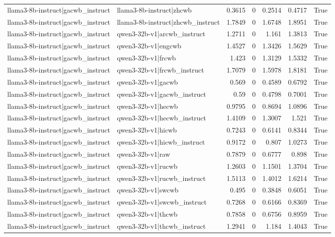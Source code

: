 \begin{table}
\begin{tabular}{l l r r r r l}
llama3-8b-instruct|gacwb_instruct & llama3-8b-instruct|zhcwb & 0.3615 & 0 & 0.2514 & 0.4717 & True \\
llama3-8b-instruct|gacwb_instruct & llama3-8b-instruct|zhcwb_instruct & 1.7849 & 0 & 1.6748 & 1.8951 & True \\
llama3-8b-instruct|gacwb_instruct & qwen3-32b-v1|arcwb_instruct & 1.2711 & 0 & 1.161 & 1.3813 & True \\
llama3-8b-instruct|gacwb_instruct & qwen3-32b-v1|engcwb & 1.4527 & 0 & 1.3426 & 1.5629 & True \\
llama3-8b-instruct|gacwb_instruct & qwen3-32b-v1|frcwb & 1.423 & 0 & 1.3129 & 1.5332 & True \\
llama3-8b-instruct|gacwb_instruct & qwen3-32b-v1|frcwb_instruct & 1.7079 & 0 & 1.5978 & 1.8181 & True \\
llama3-8b-instruct|gacwb_instruct & qwen3-32b-v1|gacwb & 0.569 & 0 & 0.4589 & 0.6792 & True \\
llama3-8b-instruct|gacwb_instruct & qwen3-32b-v1|gacwb_instruct & 0.59 & 0 & 0.4798 & 0.7001 & True \\
llama3-8b-instruct|gacwb_instruct & qwen3-32b-v1|hecwb & 0.9795 & 0 & 0.8694 & 1.0896 & True \\
llama3-8b-instruct|gacwb_instruct & qwen3-32b-v1|hecwb_instruct & 1.4109 & 0 & 1.3007 & 1.521 & True \\
llama3-8b-instruct|gacwb_instruct & qwen3-32b-v1|hicwb & 0.7243 & 0 & 0.6141 & 0.8344 & True \\
llama3-8b-instruct|gacwb_instruct & qwen3-32b-v1|hicwb_instruct & 0.9172 & 0 & 0.807 & 1.0273 & True \\
llama3-8b-instruct|gacwb_instruct & qwen3-32b-v1|raw & 0.7879 & 0 & 0.6777 & 0.898 & True \\
llama3-8b-instruct|gacwb_instruct & qwen3-32b-v1|rucwb & 1.2603 & 0 & 1.1501 & 1.3704 & True \\
llama3-8b-instruct|gacwb_instruct & qwen3-32b-v1|rucwb_instruct & 1.5113 & 0 & 1.4012 & 1.6214 & True \\
llama3-8b-instruct|gacwb_instruct & qwen3-32b-v1|swcwb & 0.495 & 0 & 0.3848 & 0.6051 & True \\
llama3-8b-instruct|gacwb_instruct & qwen3-32b-v1|swcwb_instruct & 0.7268 & 0 & 0.6166 & 0.8369 & True \\
llama3-8b-instruct|gacwb_instruct & qwen3-32b-v1|thcwb & 0.7858 & 0 & 0.6756 & 0.8959 & True \\
llama3-8b-instruct|gacwb_instruct & qwen3-32b-v1|thcwb_instruct & 1.2941 & 0 & 1.184 & 1.4043 & True \\

\end{tabular}
\end{table}
